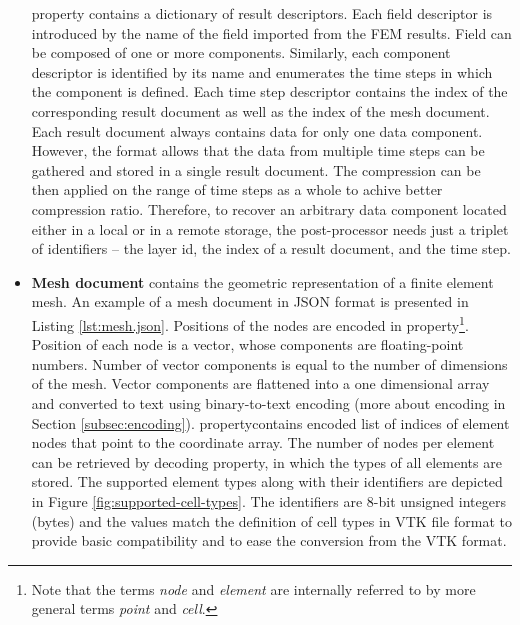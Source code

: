 \begin{itemize}
     property contains a dictionary of result descriptors. Each field descriptor is introduced by the name of the field imported from the FEM results. Field can be composed of one or more components. Similarly, each component descriptor is identified by its name and enumerates the time steps in which the component is defined. Each time step descriptor contains the index of the corresponding result document as well as the index of the mesh document. Each result document always contains data for only one data component. However, the format allows that the data from multiple time steps can be gathered and stored in a single result document. The compression can be then applied on the range of time steps as a whole to achive better compression ratio. Therefore, to recover an arbitrary data component located either in a local or in a remote storage, the post-processor needs just a triplet of identifiers -- the layer id, the index of a result document, and the time step.

    \item \textbf{Mesh document} contains the geometric representation of a finite element mesh. An example of a mesh document in JSON format is presented in Listing \ref{lst:mesh.json}. Positions of the nodes are encoded in  property\footnote{Note that the terms \textit{node} and \textit{element} are internally referred to by more general terms \textit{point} and \textit{cell}.\label{foot:points-cells}}. Position of each node is a vector, whose components are floating-point numbers. Number of vector components is equal to the number of dimensions of the mesh. Vector components are flattened into a one dimensional array and converted to text using binary-to-text encoding (more about encoding in Section \ref{subsec:encoding}).  property contains encoded list of indices of element nodes that point to the coordinate array. The number of nodes per element can be retrieved by decoding  property, in which the types of all elements are stored. The supported element types along with their identifiers are depicted in Figure \ref{fig:supported-cell-types}. The identifiers are 8-bit unsigned integers (bytes) and the values match the definition of cell types in VTK file format \cite{XXX-vtk-file-format-pdf} to provide basic compatibility and to ease the conversion from the VTK format.
    

\end{itemize}
